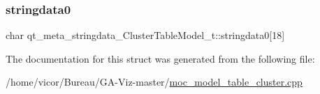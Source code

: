 \subsubsection{\texorpdfstring{stringdata0}{stringdata0}}
{\footnotesize\ttfamily char qt\+\_\+meta\+\_\+stringdata\+\_\+\+Cluster\+Table\+Model\+\_\+t\+::stringdata0\mbox{[}18\mbox{]}}



The documentation for this struct was generated from the following file\+:\begin{DoxyCompactItemize}
\item 
/home/vicor/\+Bureau/\+G\+A-\/\+Viz-\/master/\hyperlink{moc__model__table__cluster_8cpp}{moc\+\_\+model\+\_\+table\+\_\+cluster.\+cpp}\end{DoxyCompactItemize}
